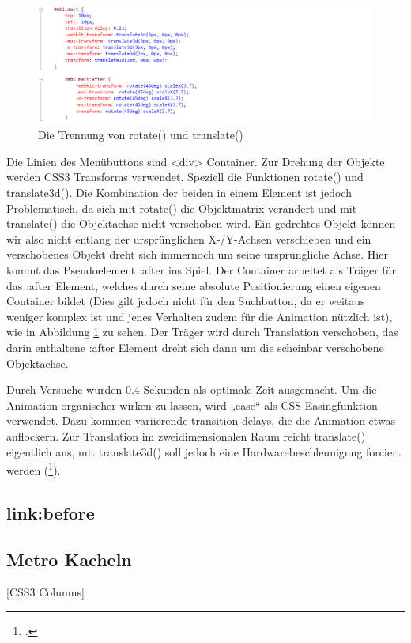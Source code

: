\begin{figure} [h]
\includegraphics[width=\textwidth]{./img/css_after.png}
\caption{Die Trennung von rotate() und translate()}
\label{css_after}
\end{figure}
Die Linien des Menübuttons sind <div> Container. Zur Drehung der Objekte werden CSS3 Transforms verwendet. Speziell die Funktionen rotate() und translate3d(). Die Kombination der beiden in einem Element ist jedoch Problematisch, da sich mit rotate() die Objektmatrix verändert und mit translate() die Objektachse nicht verschoben wird. Ein gedrehtes Objekt können wir also nicht entlang der ursprünglichen X-/Y-Achsen verschieben und ein verschobenes Objekt dreht sich immernoch um seine ursprüngliche Achse. Hier kommt das Pseudoelement :after ins Spiel. Der Container arbeitet als Träger für das :after Element, welches durch seine absolute Positionierung einen eigenen Container bildet (Dies gilt jedoch nicht für den Suchbutton, da er weitaus weniger komplex ist und jenes Verhalten zudem für die Animation nützlich ist), wie in Abbildung \ref{css_after} zu sehen. Der Träger wird durch Translation verschoben, das darin enthaltene :after Element dreht sich dann um die scheinbar verschobene Objektachse.


Durch Versuche wurden 0.4 Sekunden als optimale Zeit ausgemacht. Um die Animation organischer wirken zu lassen, wird „ease“ als CSS Easingfunktion verwendet. Dazu kommen variierende transition-delays, die die Animation etwas auflockern.
Zur Translation im zweidimensionalen Raum reicht translate() eigentlich aus, mit translate3d() soll jedoch eine Hardwarebeschleunigung forciert werden (\footcite[vgl.][]{css3D}).

\subsection{link:before}

\subsection{Metro Kacheln}
[CSS3 Columns]
